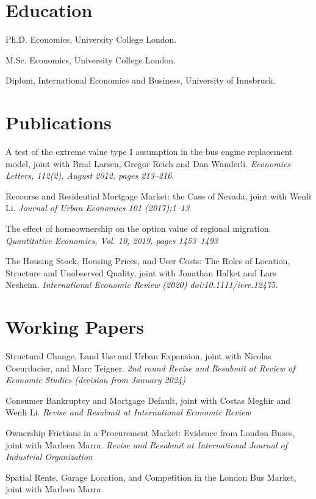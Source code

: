 \documentclass[letterpaper]{article}
\renewenvironment{itemize}{
  \begin{list}{}{
    \setlength{\leftmargin}{1.5em}
  }
}{
  \end{list}
}
\begin{document}
\section*{Education}

\begin{itemize}
  \setlength{\itemindent}{26pt}
  \item[2015:] Ph.D. Economics, University College London.
   
  \item[2008:] M.Sc. Economics, University College London.

  \item[2006:] Diplom, International Economics and Business, University of Innsbruck.

\end{itemize}


\section*{Publications}

\begin{itemize}
\item A test of the extreme value type I assumption in the bus engine replacement model, joint with Brad Larsen, Gregor Reich and Dan Wunderli. {\it Economics Letters, 112(2), August 2012, pages 213--216}.
\item Recourse and Residential Mortgage Market: the Case of Nevada, joint with Wenli Li. {\it Journal of Urban Economics 101 (2017):1–13}.
\item The effect of homeownership on the option value of regional migration. {\it Quantitative Economics, Vol. 10, 2019, pages 1453--1493}
\item The Housing Stock, Housing Prices, and User Costs: The Roles of Location, Structure and Unobserved Quality, joint with Jonathan Halket and Lars Nesheim. {\it International Economic Review (2020) doi:10.1111/iere.12475.}
\end{itemize}


\section*{Working Papers}

\begin{itemize}

\item Structural Change, Land Use and Urban Expansion, joint with Nicolas Coeurdacier, and Marc Teigner. {\it 2nd round Revise and Resubmit at Review of Economic Studies (decision from January 2024)}
\item Consumer Bankruptcy and Mortgage Default, joint with Costas Meghir and Wenli Li. {\it Revise and Resubmit at International Economic Review}
\item Ownership Frictions in a Procurement Market: Evidence from London Buses, joint with Marleen Marra. {\it Revise and Resubmit at International Journal of Industrial Organization}
\item Spatial Rents, Garage Location, and Competition in the London Bus Market, joint with Marleen Marra.
\end{itemize}
\end{document}
